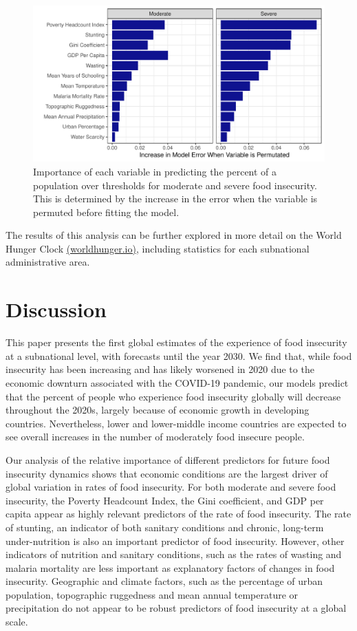 \documentclass{article}
\begin{document}
\begin{figure}[h]
  \centering
  \includegraphics[width=\linewidth]{img/VIMP.pdf}
  \caption{Importance of each variable in predicting the percent of a population over thresholds for moderate and severe food insecurity.  This is determined by the increase in the error when the variable is permuted before fitting the model.}
  \label{fig:vimp}
\end{figure}

The results of this analysis can be further explored in more detail on the World Hunger Clock \href{https://worldhunger.io}{(worldhunger.io)}, including statistics for each subnational administrative area.

\section{Discussion}
This paper presents the first global estimates of the experience of food insecurity at a subnational level, with forecasts until the year 2030.  We find that, while food insecurity has been increasing and has likely worsened in 2020 due to the economic downturn associated with the COVID-19 pandemic, our models predict that the percent of people who experience food insecurity globally will decrease throughout the 2020s, largely because of economic growth in developing countries.  Nevertheless, lower and lower-middle income countries are expected to see overall increases in the number of moderately food insecure people. 

Our analysis of the relative importance of different predictors for future food insecurity dynamics shows that economic conditions are the largest driver of global variation in rates of food insecurity. For both moderate and severe food insecurity, the Poverty Headcount Index, the Gini coefficient, and GDP per capita appear as highly relevant predictors of the rate of food insecurity. The rate of stunting, an indicator of both sanitary conditions and chronic, long-term under-nutrition is also an important predictor of food insecurity. However, other indicators of nutrition and sanitary conditions, such as the rates of wasting and malaria mortality are less important as explanatory factors of changes in food insecurity. Geographic and climate factors, such as the percentage of urban population, topographic ruggedness and mean annual temperature or precipitation do not appear to be robust predictors of food insecurity at a global scale. 
\end{document}
